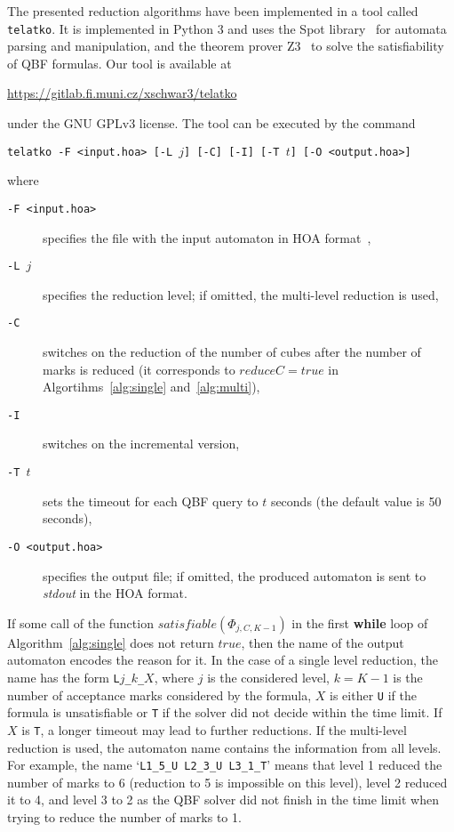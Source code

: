 \documentclass[a4paper,UKenglish,cleveref,autoref,thm-restate]{lipics-v2021}
\def\true{\mathit{true}}
\newcommand{\telatko}{\texttt{telatko}\xspace}
\begin{document}
The presented reduction algorithms have been implemented in a tool
called \telatko. It is implemented in Python 3 and uses the Spot
library~\cite{duret.16.atva2} for automata parsing and manipulation,
and the theorem prover Z3~\cite{demoura.08.tacas} to solve the
satisfiability of QBF formulas. Our tool is available at
\begin{center}
\url{https://gitlab.fi.muni.cz/xschwar3/telatko}
\end{center}
under the GNU GPLv3
license. The tool can be executed by the command 
\begin{center}
  \texttt{telatko -F <input.hoa> [-L }$j$\texttt{] [-C] [-I] [-T }$t$\texttt{] [-O <output.hoa>]}
\end{center}
where
\begin{description}
\item[\texttt{-F <input.hoa>}] specifies the file with the input automaton in HOA format~\cite{babiak.15.cav}, 
\item[\texttt{-L }$j$] specifies the reduction level; if omitted, the multi-level reduction is used,
\item[\texttt{-C}] switches on the reduction of the number of cubes
  after the number of marks is reduced (it corresponds to
  $\mathit{reduceC}=\true$ in Algortihms~\ref{alg:single}
  and~\ref{alg:multi}),
\item[\texttt{-I}] switches on the incremental version,
\item[\texttt{-T }$t$] sets the timeout for each QBF query to $t$ seconds (the default value is 50 seconds), 
\item[\texttt{-O <output.hoa>}] specifies the output file; if omitted,
  the produced automaton is sent to \textit{stdout} in the HOA format.
\end{description}

If some call of the function
$\mathit{satisfiable}(\Phi_{j,C,K{-}1})$ in the first
\textbf{while} loop of Algorithm~\ref{alg:single} does not return
$\true$, then the name of the output automaton encodes the reason for
it. In the case of a single level reduction, the name has the form
\texttt{L$j$\_$k$\_$X$}, where $j$ is the considered level, $k=K-1$ is
the number of acceptance marks considered by the formula, $X$ is either
\texttt{U} if the formula is unsatisfiable or \texttt{T} if the solver
did not decide within the time limit. If $X$ is \texttt{T}, a longer
timeout may lead to further reductions. If the multi-level reduction
is used, the automaton name contains the information from all
levels. For example, the name `\texttt{L1\_5\_U L2\_3\_U L3\_1\_T}'
means that level 1 reduced the number of marks to 6 (reduction to 5 is
impossible on this level), level 2 reduced it to 4, and level 3 to 2
as the QBF solver did not finish in the time limit when trying to
reduce the number of marks to
1.%
\end{document}

